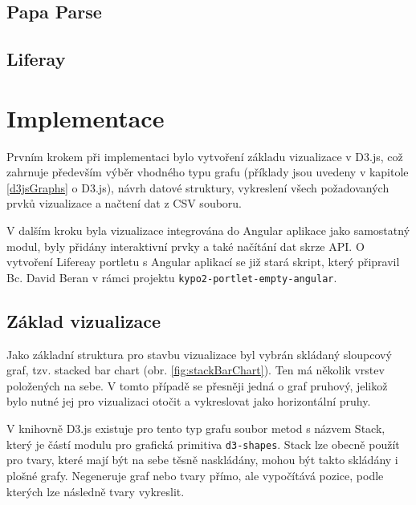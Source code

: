 \documentclass[
  digital, %
  oneside, %
  table,   %
  nolof,     %
  nolot,     %
]{fithesis3}
\begin{document}
\section{Papa Parse}
\section{Liferay} \label{liferay}

\chapter{Implementace}
Prvním krokem při implementaci bylo vytvoření základu vizualizace v D3.js, což zahrnuje především výběr vhodného typu grafu (příklady jsou uvedeny v kapitole \ref{d3jsGraphs} o D3.js), návrh datové struktury, vykreslení všech požadovaných prvků vizualizace a načtení dat z CSV souboru.\par
V dalším kroku byla vizualizace integrována do Angular aplikace jako samostatný modul, byly přidány interaktivní prvky a také načítání dat skrze API. O vytvoření Lifereay portletu s Angular aplikací se již stará skript, který připravil Bc. David Beran v rámci projektu \verb|kypo2-portlet-empty-angular|.
\section{Základ vizualizace}
Jako základní struktura pro stavbu vizualizace byl vybrán skládaný sloupcový graf, tzv. stacked bar chart (obr. \ref{fig:stackBarChart}). Ten má několik vrstev položených na sebe. V tomto případě se přesněji jedná o graf pruhový, jelikož bylo nutné jej pro vizualizaci otočit a vykreslovat jako horizontální pruhy.\par
V knihovně D3.js existuje pro tento typ grafu soubor metod s názvem Stack, který je částí modulu pro grafická primitiva \verb|d3-shapes|. Stack lze obecně použít pro tvary, které mají být na sebe těsně naskládány, mohou být takto skládány i plošné grafy. Negeneruje graf nebo tvary přímo, ale vypočítává pozice, podle kterých lze následně tvary vykreslit. \cite{d3jsorg}\par
\end{document}
